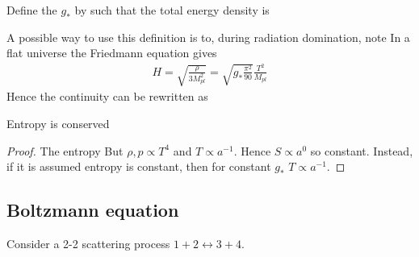 \documentclass{article}
\begin{document}
\begin{definition}\label{def:CSM:1}
Define the  $g_\ast$ by 
such that the total energy density is
\end{definition}

\begin{example}
A possible way to use this definition is to, during radiation domination, note 
In a flat universe the Friedmann equation gives 
\begin{align}\label{eq:CSM:5}
H = \sqrt{\frac{\rho}{3 M_{pl}^2}} = \sqrt{g_\ast \frac{\pi^2}{90} } \frac{T^2}{M_{pl}}
\end{align}
Hence the continuity can be rewritten as 
\end{example}

\begin{prop}
Entropy is conserved
\end{prop}
\begin{proof}
The entropy 
But $\rho,p \propto T^4$ and $T\propto a^{-1}$. Hence $S \propto a^0$ so constant. Instead, if it is assumed entropy is constant, then for constant $g_\ast$ $T\propto a^{-1}$. 
\end{proof}

\subsection{Boltzmann equation}
Consider a 2-2 scattering process $1+2 \leftrightarrow 3+4$. 
\end{document}
